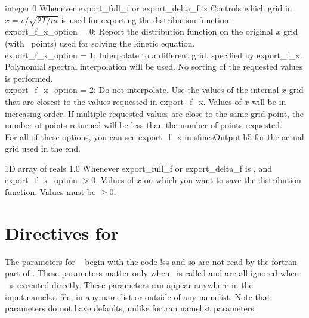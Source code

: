 {integer}
{0}
{Whenever {\ttfamily export\_full\_f} or {\ttfamily export\_delta\_f} is \true}
{Controls which grid in $x = v/\sqrt{2T/m}$ is used for exporting the distribution function.\\

{\ttfamily export\_f\_x\_option} = 0: Report the distribution function on the original $x$ grid (with \Nx~points) used for solving the kinetic equation.\\

{\ttfamily export\_f\_x\_option} = 1: Interpolate to a different grid, specified by {\ttfamily export\_f\_x}.  Polynomial spectral interpolation will be used.
  No sorting of the requested values is performed.\\

{\ttfamily export\_f\_x\_option} = 2: Do not interpolate. Use the values of the internal $x$ grid that are closest to the values requested in {\ttfamily export\_f\_x}.
  Values of $x$ will be in increasing order. If multiple requested values are close to the same grid point, the number of
  points returned will be less than the number of points requested.\\

For all of these options, you can see {\ttfamily export\_f\_x} in {\ttfamily sfincsOutput.h5} for the actual grid used in the end.
}

\myhrule

{1D array of reals}
{1.0}
{Whenever {\ttfamily export\_full\_f} or {\ttfamily export\_delta\_f} is \true, and {\ttfamily export\_f\_x\_option} $>0$.}
{Values of $x$ on which you want to save the distribution function.  Values must be $\ge 0$.}




















\section{Directives for \sfincsScan}
\label{sec:sfincsScanParams}

The parameters for \sfincsScan~ begin with the code {\ttfamily !ss} and so are not read by the fortran part of \sfincs.
These parameters matter only when \sfincsScan~is called and are all ignored when \sfincs~is executed directly.
These parameters can appear anywhere in the {\ttfamily input.namelist} file, in any namelist or outside of any namelist.
Note that \sfincsScan~ parameters do not have defaults, unlike fortran namelist parameters.\\


